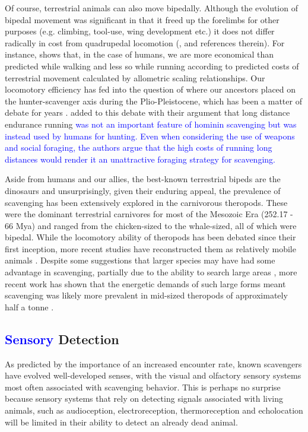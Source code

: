 \documentclass[a4paper,12pt]{article}
\begin{document}
Of course, terrestrial animals can also move bipedally. 
Although the evolution of bipedal movement was significant in that it freed up the forelimbs for other purposes (e.g. climbing, tool-use, wing development etc.) it does not differ radically in cost from quadrupedal locomotion (\cite{williams1999evolution}, and references therein). 
For instance, \cite{alexander2004bipedal} shows that, in the case of humans, we are more economical than predicted while walking and less so while running according to predicted costs of terrestrial movement calculated by allometric scaling relationships.
Our locomotory efficiency has fed into the question of where our ancestors placed on the hunter-scavenger axis during the Plio-Pleistocene, which has been a matter of debate for years \citep{dominguez2002hunting}.
\cite{ruxton2013endurance} added to this debate with their argument that long distance endurance running \textcolor{blue}{was not an important feature of hominin scavenging but was instead used by humans for hunting.
Even when considering the use of weapons and social foraging, the authors argue that the high costs of running long distances would render it an unattractive foraging strategy for scavenging.}

Aside from humans and our allies, the best-known terrestrial bipeds are the dinosaurs and unsurprisingly, given their enduring appeal, the prevalence of scavenging has been extensively explored in the carnivorous theropods.
These were the dominant terrestrial carnivores for most of the Mesozoic Era (252.17 - 66 Mya) and ranged from the chicken-sized to the whale-sized, all of which were bipedal.
While the locomotory ability of theropods has been debated since their first inception, more recent studies have reconstructed them as relatively mobile animals \citep{pontzer2009biomechanics}. 
Despite some suggestions that larger species may have had some advantage in scavenging, partially due to the ability to search large areas \citep{ruxton2003could}, more recent work has shown that the energetic demands of such large forms meant scavenging was likely more prevalent in mid-sized theropods of approximately half a tonne \citep{kane2016body}.

\subsection{\textcolor{blue}{Sensory} Detection}

As predicted by the importance of an increased encounter rate, known scavengers have evolved well-developed senses, with the visual and olfactory sensory systems most often associated with scavenging behavior. 
This is perhaps no surprise because sensory systems that rely on detecting signals associated with living animals, such as audioception, electroreception, thermoreception and echolocation will be limited in their ability to detect an already dead animal.
\end{document}
